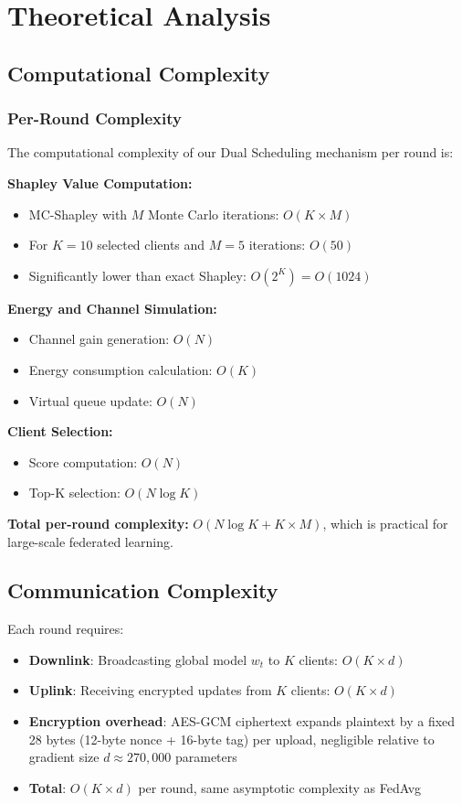 \section{Theoretical Analysis}

\subsection{Computational Complexity}

\subsubsection{Per-Round Complexity}

The computational complexity of our Dual Scheduling mechanism per round is:

\textbf{Shapley Value Computation:}
\begin{itemize}
\item MC-Shapley with $M$ Monte Carlo iterations: $O(K \times M)$
\item For $K=10$ selected clients and $M=5$ iterations: $O(50)$
\item Significantly lower than exact Shapley: $O(2^K) = O(1024)$
\end{itemize}

\textbf{Energy and Channel Simulation:}
\begin{itemize}
\item Channel gain generation: $O(N)$
\item Energy consumption calculation: $O(K)$
\item Virtual queue update: $O(N)$
\end{itemize}

\textbf{Client Selection:}
\begin{itemize}
\item Score computation: $O(N)$
\item Top-K selection: $O(N \log K)$
\end{itemize}

\textbf{Total per-round complexity:} $O(N \log K + K \times M)$, which is practical for large-scale federated learning.

\subsection{Communication Complexity}

Each round requires:
\begin{itemize}
\item \textbf{Downlink}: Broadcasting global model $w_t$ to $K$ clients: $O(K \times d)$
\item \textbf{Uplink}: Receiving encrypted updates from $K$ clients: $O(K \times d)$
\item \textbf{Encryption overhead}: AES-GCM ciphertext expands plaintext by a fixed 28 bytes (12-byte nonce + 16-byte tag) per upload, negligible relative to gradient size $d \approx 270{,}000$ parameters
\item \textbf{Total}: $O(K \times d)$ per round, same asymptotic complexity as FedAvg
\end{itemize}

